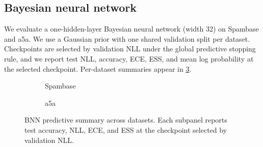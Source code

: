 \subsection{Bayesian neural network}

We evaluate a one-hidden-layer Bayesian neural network (width 32) on
Spambase and a5a. We use a Gaussian prior with one shared validation split per
dataset. Checkpoints are selected by validation NLL
under the global predictive stopping rule, and we report test NLL, accuracy,
ECE, ESS, and mean log probability at the selected checkpoint. Per-dataset
summaries appear in \cref{fig:bnn_summary}.

\begin{figure}[t]
  \centering
  \begin{subfigure}[t]{0.9\linewidth}
    \centering
    \caption{Spambase}
    \label{fig:bnn_spambase}
  \end{subfigure}

  \vspace{0.25em}

  \begin{subfigure}[t]{0.9\linewidth}
    \centering
    \caption{a5a}
    \label{fig:bnn_a5a}
  \end{subfigure}
  \caption{BNN predictive summary across datasets. Each subpanel reports test
  accuracy, NLL, ECE, and ESS at the checkpoint selected by validation NLL.}
  \label{fig:bnn_summary}
\end{figure}

